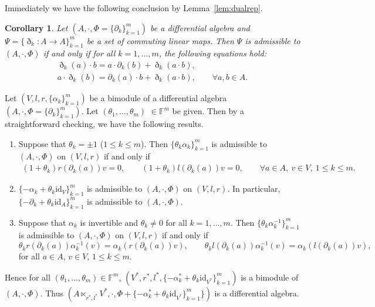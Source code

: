 \documentclass[10pt,a4paper]{amsart}
\numberwithin{equation}{section}
\newtheorem{Corollary}[Theorem]{Corollary}
\newcommand{\id}{\mathrm{id}}
\begin{document}
Immediately we have the following conclusion by Lemma~\ref{lem:dualrep}.

\begin{Corollary}\label{cor:qadm}
 Let $(A, \cdot, \Phi = \{\partial_k\}_{k=1}^m)$ be a differential algebra
 and $\Psi = \{\eth_k\colon A \to A \}_{k=1}^m$ be a set of commuting linear maps.
 Then
 $\Psi$ is admissible to $(A, \cdot, \Phi)$ if and only if for all $k=1, \dots, m$,
 the following equations hold:
 \begin{gather}
 \eth_k(a) \cdot b = a \cdot \partial_k(b) + \eth_k(a \cdot b), \label{eq:qadm1} \\
 a \cdot \eth_k(b) = \partial_k(a) \cdot b + \eth_k(a \cdot b), \qquad
 \forall a,b \in A. \label{eq:qadm2}
 \end{gather}
\end{Corollary}

\begin{Example}\label{ex:admissible}
 Let $(V, l, r, \{\alpha_k\}_{k=1}^m)$ be a bimodule of a differential algebra $(A, \cdot, \Phi = \{\partial_k\}_{k=1}^m)$.
 Let $(\theta_1, \dots, \theta_m)$ $\in \mathbb{F}^m$ be given.
 Then by a straightforward checking, we have the following results.
 \begin{enumerate}\itemsep=0pt
 \item Suppose that $\theta_k = \pm 1$ ($1 \leq k \leq m$).
 Then $\{\theta_k \alpha_k\}_{k=1}^m$ is admissible to $(A, \cdot, \Phi)$ on $(V, l, r)$ if and only if
 \begin{gather*}
 (1 + \theta_k)r(\partial_k(a)) v = 0, \qquad
 (1 + \theta_k)l(\partial_k(a)) v = 0, \qquad
 \forall a \in A, \ v \in V, \ 1 \leq k \leq m.
 \end{gather*}
 \item $\{-\alpha_k + \theta_k \id_V\}_{k=1}^m$ is admissible to $(A, \cdot, \Phi)$ on $(V, l, r)$.
 In particular, $\{-\partial_k + \theta_k \id_A \}_{k=1}^m$ is admissible to $(A, \cdot, \Phi)$.
 \item Suppose that $\alpha_k$ is invertible and $\theta_k \neq 0$ for all $k=1, \dots, m$.
 Then $\big\{\theta_k \alpha_k^{-1}\big\}_{k=1}^m$ is admissible to $(A, \cdot, \Phi)$ on $(V, l, r)$ if and only if
 \begin{equation*}
 \theta_k r(\partial_k(a)) \alpha_k^{-1}(v) = \alpha_k(r(\partial_k(a))v), \qquad
 \theta_k l(\partial_k(a)) \alpha_k^{-1}(v) = \alpha_k(l(\partial_k(a))v),
 \end{equation*}
 	for all $a \in A$, $v \in V$, $1 \leq k \leq m$.
 \end{enumerate}
 Hence for all $(\theta_1, \dots, \theta_m) \in \mathbb{F}^m$,
 $(V^*, r^*, l^*, \{-\alpha_k^* + \theta_k \id_{V^*} \}_{k=1}^m)$ is a bimodule of $(A, \cdot, \Phi)$.
 Thus $(A \ltimes_{r^*, l^*} V^*, \cdot, \Phi + \{-\alpha_k^* + \theta_k \id_{V^*}\}_{k=1}^m \})$ is a differential algebra.
\end{Example}
\end{document}
